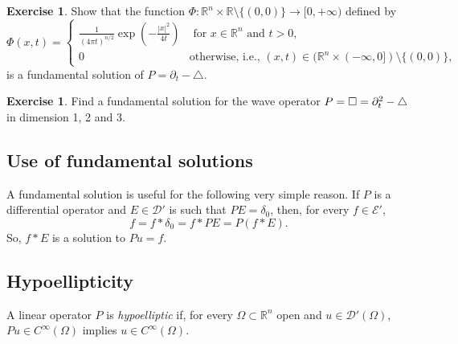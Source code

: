\documentclass[a4paper,9pt]{amsart}
\newcommand{\scr}[1]{\mathscr{#1}}
\newcommand{\R}{\mathbb{R}}	%
\newcommand{\de}{\partial}		%
\newcommand{\laplacian}{\triangle}
\theoremstyle{plain}
\theoremstyle{definition}
\newtheorem{exercise}[proposition]{Exercise}%
\theoremstyle{remark}
\begin{document}
\begin{exercise} %
	Show that the function 
	$\Phi:\R^n\times\R\setminus\{(0,0)\} \to [0,+\infty)$ defined by
	\begin{equation}%
		\Phi(x,t) = \begin{cases}
		\frac{1}{(4\pi t)^{n/2}} \exp\left( -\frac{|x|^2}{4t} \right)
			& \text{ for $x\in\R^n$ and $t>0$,} \\
		0 & \text{otherwise, i.e., }(x,t)\in(\R^n\times(-\infty,0])\setminus\{(0,0)\} ,
		\end{cases}
	\end{equation}
	is a fundamental solution of $P=\de_t-\laplacian$.
\end{exercise}%

\begin{exercise}
	Find a fundamental solution for the wave operator $P = \waveop = \de_t^2-\laplacian$
	in dimension 1, 2 and 3.
\end{exercise}

\subsection{Use of fundamental solutions}\label{subs6889edd6}
A fundamental solution is useful for the following very simple reason.
If $P$ is a differential operator and $E\in\scr D'$ is such that $PE=\delta_0$, then, 
for every $f\in\scr E'$,
\begin{equation}
	f = f*\delta_0 = f*PE = P(f*E) .
\end{equation}
So, $f*E$ is a solution to $Pu=f$.

\subsection{Hypoellipticity}
A linear operator $P$ is \emph{hypoelliptic} if, for every $\Omega\subset \R^n$ open and  $u\in\scr D'(\Omega)$, 
$Pu\in C^\infty(\Omega)$ implies $u\in C^\infty(\Omega)$.
\end{document}
